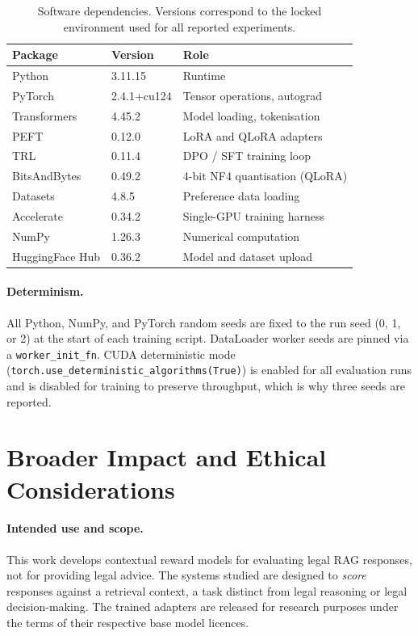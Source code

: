 \documentclass{article}
\theoremstyle{plain}
\theoremstyle{definition}
\theoremstyle{remark}
\begin{document}
\begin{table}[h]
\centering
\caption{Software dependencies. Versions correspond to the locked environment used for all reported experiments.}
\label{app:tab:software}
\small
\setlength{\tabcolsep}{2pt}
\begin{tabular}{lll}
\toprule
\textbf{Package} & \textbf{Version} & \textbf{Role} \\
\midrule
Python          & 3.11.15      & Runtime \\
PyTorch         & 2.4.1+cu124  & Tensor operations, autograd \\
Transformers    & 4.45.2       & Model loading, tokenisation \\
PEFT            & 0.12.0       & LoRA and QLoRA adapters \\
TRL             & 0.11.4       & DPO / SFT training loop \\
BitsAndBytes    & 0.49.2       & 4-bit NF4 quantisation (QLoRA) \\
Datasets        & 4.8.5        & Preference data loading \\
Accelerate      & 0.34.2       & Single-GPU training harness \\
NumPy           & 1.26.3       & Numerical computation \\
HuggingFace Hub & 0.36.2       & Model and dataset upload \\
\bottomrule
\end{tabular}
\end{table}

\paragraph{Determinism.}
All Python, NumPy, and PyTorch random seeds are fixed to the run seed (0, 1, or 2) at the start of each training script.  DataLoader worker seeds are pinned via a \texttt{worker\_init\_fn}.  CUDA deterministic mode (\texttt{torch.use\_deterministic\_algorithms(True)}) is enabled for all evaluation runs and is disabled for training to preserve throughput, which is why three seeds are reported.

\section{Broader Impact and Ethical Considerations}
\label{app:ethics}

\paragraph{Intended use and scope.}
This work develops contextual reward models for evaluating legal RAG responses, not for providing legal advice.  The systems studied are designed to \emph{score} responses against a retrieval context, a task distinct from legal reasoning or legal decision-making.  The trained adapters are released for research purposes under the terms of their respective base model licences.
\end{document}
